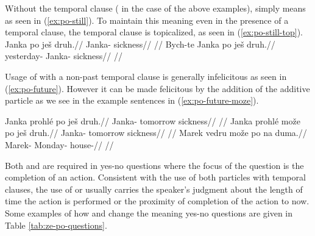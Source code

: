 Without the temporal clause ( in the case of the above examples),
 simply means  as seen in (\ref{ex:po-still}). To maintain
this meaning even in the presence of a temporal clause, the temporal clause is
topicalized, as seen in (\ref{ex:po-still-top}).
\pex
\a\label{ex:po-still}
\begingl
	\gla Janka po ješ druh.//
	\glb Janka-\Acc{} \Ipfv{} \Exst{} sickness//
	\glft {}//
\endgl
\a\label{ex:po-still-top}
\begingl
	\gla Bych-te Janka po ješ druh.//
	\glb yesterday-\Foc{} Janka-\Acc{} \Ipfv{} \Exst{} sickness//
	\glft {}//
\endgl
\xe

Usage of  with a non-past temporal clause is generally infelicitous as
seen in (\ref{ex:po-future}). However it can be made felicitous by the addition
of the additive particle  as we see in the example sentences in
(\ref{ex:po-future-moze}).

\pex\label{ex:po-future}
\begingl
	\gla \ljudge{\#}Janka prohlé po ješ druh.//
	\glb Janka-\Acc{} tomorrow \Ipfv{} \Exst{} sickness//
	\glft {}//
\endgl
\xe
\pex\label{ex:po-future-moze}
\a
\begingl
	\gla Janka prohlé može po ješ druh.//
	\glb Janka-\Acc{} tomorrow \Add{} \Ipfv{} \Exst{} sickness//
	\glft {}//
\endgl
\a
\begingl
	\gla Marek vedru može po na duma.//
	\glb Marek-\Acc{} Monday-\Ins{} \Add{} \Ipfv{} \Loc{} house-\Acc{}//
	\glft {}//
\endgl
\xe

Both  and  are required in yes-no questions where the focus of
the question is the completion of an action. Consistent with the use of both
particles with temporal clauses, the use of  or  usually carries
the speaker's judgment about the length of time the action is performed or the
proximity of completion of the action to now. Some examples of how  and
 change the meaning yes-no questions are given in Table
\ref{tab:ze-po-questions}.

